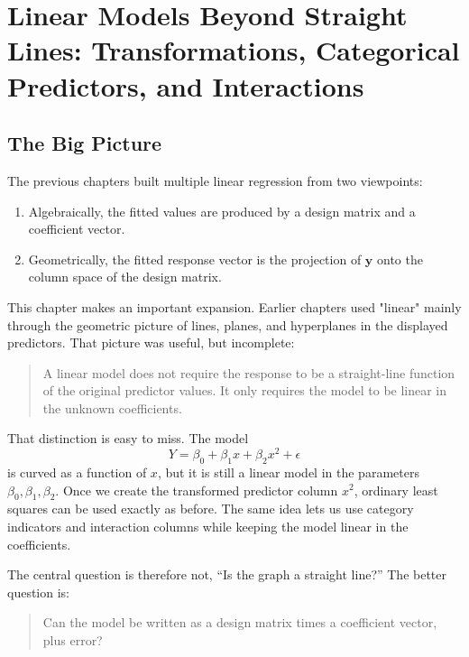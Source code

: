 \chapter[Linear Models Beyond Straight Lines]{Linear Models Beyond Straight Lines: Transformations, Categorical Predictors, and Interactions}
\label{chap:linear-models-beyond-straight-lines}

\section{The Big Picture}

The previous chapters built multiple linear regression from two viewpoints:
\begin{enumerate}
  \item Algebraically, the fitted values are produced by a design matrix and a coefficient vector.
  \item Geometrically, the fitted response vector is the projection of \(\mathbf{y}\) onto the column space of the design matrix.
\end{enumerate}

This chapter makes an important expansion.  Earlier chapters used "linear" mainly through the geometric picture of lines, planes, and hyperplanes in the displayed predictors.  That picture was useful, but incomplete:
\begin{quote}
  A linear model does not require the response to be a straight-line function of the original predictor values.  It only requires the model to be linear in the unknown coefficients.
\end{quote}

That distinction is easy to miss.  The model
\begin{equation}
  Y=\beta_0+\beta_1x+\beta_2x^2+\epsilon
\end{equation}
is curved as a function of \(x\), but it is still a linear model in the parameters \(\beta_0,\beta_1,\beta_2\).  Once we create the transformed predictor column \(x^2\), ordinary least squares can be used exactly as before.  The same idea lets us use category indicators and interaction columns while keeping the model linear in the coefficients.

The central question is therefore not, ``Is the graph a straight line?''  The better question is:
\begin{quote}
  Can the model be written as a design matrix times a coefficient vector, plus error?
\end{quote}

